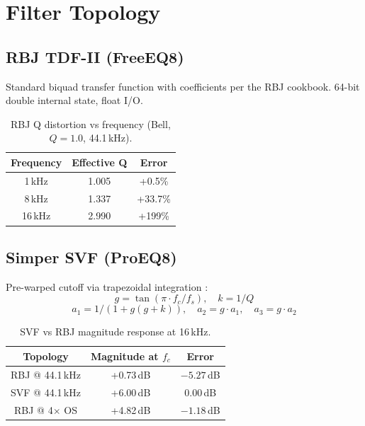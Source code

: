 \documentclass[11pt,a4paper]{article}
\begin{document}
\section{Filter Topology}

\subsection{RBJ TDF-II (FreeEQ8)}
Standard biquad transfer function with coefficients per the RBJ cookbook. 64-bit double internal state, float I/O.

\begin{table}[ht]
  \caption{RBJ Q distortion vs frequency (Bell, $Q=1.0$, 44.1\,kHz).}
  \centering
  \begin{tabular}{ccc}\toprule
    Frequency & Effective Q & Error \\\midrule
    1\,kHz & 1.005 & +0.5\% \\
    8\,kHz & 1.337 & +33.7\% \\
    16\,kHz & 2.990 & +199\% \\\bottomrule
  \end{tabular}
  \label{tab:qdistortion}
\end{table}

\subsection{Simper SVF (ProEQ8)}
Pre-warped cutoff via trapezoidal integration \cite{simper}:
\begin{equation}
g = \tan(\pi \cdot f_c / f_s), \quad k = 1/Q
\end{equation}
\begin{equation}
a_1 = 1 / (1 + g(g + k)), \quad a_2 = g \cdot a_1, \quad a_3 = g \cdot a_2
\end{equation}

\begin{table}[ht]
  \caption{SVF vs RBJ magnitude response at 16\,kHz.}
  \centering
  \begin{tabular}{ccc}\toprule
    Topology & Magnitude at $f_c$ & Error \\\midrule
    RBJ @ 44.1\,kHz & +0.73\,dB & $-5.27$\,dB \\
    SVF @ 44.1\,kHz & +6.00\,dB & 0.00\,dB \\
    RBJ @ 4$\times$ OS & +4.82\,dB & $-1.18$\,dB \\\bottomrule
  \end{tabular}
  \label{tab:svfvsrbj}
\end{table}
\end{document}
